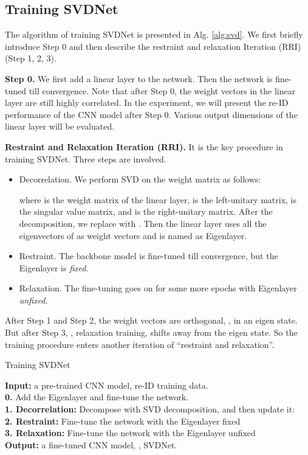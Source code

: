 \documentclass[10pt,twocolumn,letterpaper]{article}
\begin{document}
\subsection{Training SVDNet} \label{sec:training}
The algorithm of training SVDNet is presented in Alg. \ref{alg:svd}. We first briefly introduce Step 0 and then describe the restraint and relaxation Iteration (RRI) (Step 1, 2, 3).

\textbf{Step 0.} We first add a linear layer to the network. Then the network is fine-tuned till convergence. Note that after Step 0, the weight vectors in the linear layer are still highly correlated. In the experiment, we will present the re-ID performance of the CNN model after Step 0. Various output dimensions of the linear layer will be evaluated.

\textbf{Restraint and Relaxation Iteration (RRI).} It is the key procedure in training SVDNet. Three steps are involved.
\begin{itemize}
\item Decorrelation. We perform SVD on the weight matrix as follows:

where  is the weight matrix of the linear layer,  is the left-unitary matrix,  is the singular value matrix, and  is the right-unitary matrix.
After the decomposition, we replace  with . Then the linear layer uses all the eigenvectors of  as weight vectors and is named as Eigenlayer. 
\item Restraint. The backbone model is fine-tuned till convergence, but the Eigenlayer is \emph{fixed}.
\item Relaxation. The fine-tuning goes on for some more epochs with Eigenlayer \emph{unfixed}. 
\end{itemize}


After Step 1 and Step 2, the weight vectors are orthogonal, \ie, in an eigen state. But after Step 3, \ie, relaxation training,  shifts away from the eigen state. So the training procedure enters another iteration  of ``restraint and relaxation''. 

\begin{algorithm}[t]
\caption{Training SVDNet}
\textbf{Input:} a pre-trained CNN model, re-ID training data.\\
\textbf{0.} Add the Eigenlayer and fine-tune the network.\\
\For{}
{ 
\textbf{1. Decorrelation:} Decompose  with SVD decomposition, and then update it: {}\\
\textbf{2. Restraint:} Fine-tune the network with the Eigenlayer fixed \\
\textbf{3. Relaxation:} Fine-tune the network with the Eigenlayer unfixed \\
} 
\textbf{Output:} a fine-tuned CNN model, \ie, SVDNet.\\
\label{alg:svd}
\end{algorithm}
\end{document}
